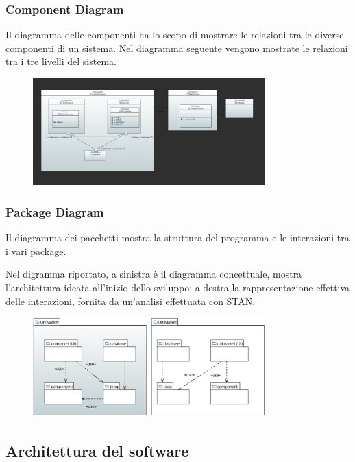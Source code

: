 \documentclass[a4paper,12pt]{article}
\begin{document}
\subsubsection{Component Diagram}
Il diagramma delle componenti ha lo scopo di mostrare le relazioni tra le diverse componenti di un sistema. Nel diagramma seguente vengono mostrate le relazioni tra i tre livelli del sistema.
\begin{figure}[H]
    \centering
    \includegraphics[width=0.8\textwidth]{../UML/UML png/diagramma dei Componenti.png}
    \label{fig:Component Diagram}
\end{figure}
\subsubsection{Package Diagram}
Il diagramma dei pacchetti mostra la struttura del programma e le interazioni tra i vari package.

Nel digramma riportato, a sinistra è il diagramma concettuale, mostra l'architettura ideata all'inizio dello sviluppo; a destra la rappresentazione effettiva delle interazioni, fornita da un'analisi effettuata con STAN.
\begin{figure}[H]
    \centering
    \includegraphics[width=0.8\textwidth]{../UML/UML png/PackageDiagram.png}
    \label{fig:Package Diagram}
\end{figure}
\subsection{Architettura del software}
\end{document}
